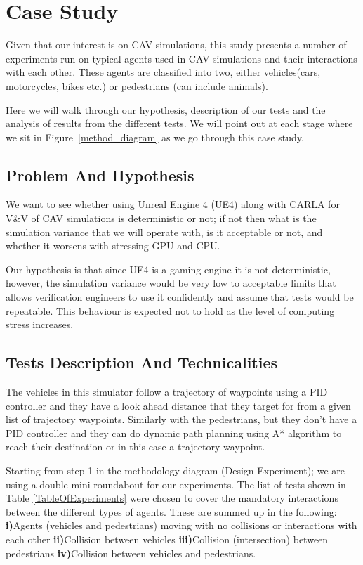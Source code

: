 \section{Case Study} \label{s:case-study}
Given that our interest is on CAV simulations, this study presents a number of experiments run on typical agents used in CAV simulations and their interactions with each other. These agents are classified into two, either vehicles(cars, motorcycles, bikes etc.) or pedestrians (can include animals).

Here we will walk through our hypothesis, description of our tests and the analysis of results from the different tests. We will point out at each stage where we sit in Figure~\ref{method_diagram} as we go through this case study.    

\subsection{Problem And Hypothesis}
We want to see whether using Unreal Engine 4 (UE4) along with CARLA \cite{CARLA_paper} for V\&V of CAV simulations is deterministic or not; if not then what is the simulation variance that we will operate with, is it acceptable or not, and whether it worsens with stressing GPU and CPU.

Our hypothesis is that since UE4 is a gaming engine it is not deterministic, however, the simulation variance would be very low to acceptable limits that allows verification engineers to use it confidently and assume that tests would be repeatable.
This behaviour is expected not to hold as the level of computing stress increases.     

\subsection{Tests Description And Technicalities}\label{TestsDescriptionAndTechnicalities}
The vehicles in this simulator follow a trajectory of waypoints using a PID controller and they have a look ahead distance that they target for from a given list of trajectory waypoints. 
Similarly with the pedestrians, but they don't have a PID controller and they can do dynamic path planning using A* algorithm to reach their destination or in this case a trajectory waypoint.

Starting from step 1 in the methodology diagram (Design Experiment); we are using a double mini roundabout for our experiments. 
The list of tests shown in Table \ref{TableOfExperiments} were chosen to cover the mandatory interactions between the different types of agents. 
These are summed up in the following: \textbf{i)}Agents (vehicles and pedestrians) moving with no collisions or interactions with each other \textbf{ii)}Collision between vehicles \textbf{iii)}Collision (intersection) between pedestrians \textbf{iv)}Collision between vehicles and pedestrians.

